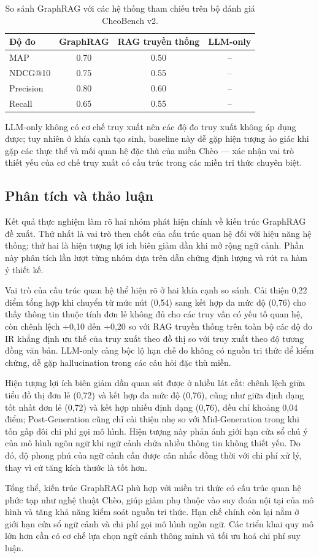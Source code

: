 \begin{table}[h]
\centering
\caption{So sánh GraphRAG với các hệ thống tham chiếu trên bộ đánh giá CheoBench v2.}
\label{tab:baseline_results}
\begin{tabular}{lccc}
\hline
\textbf{Độ đo} & \textbf{GraphRAG} & \textbf{RAG truyền thống} & \textbf{LLM-only} \\
\hline
MAP            & 0.70 & 0.50 & -- \\
NDCG@10        & 0.75 & 0.55 & -- \\
Precision      & 0.80 & 0.60 & -- \\
Recall         & 0.65 & 0.55 & -- \\
\hline
\end{tabular}
\end{table}

LLM-only không có cơ chế truy xuất nên các độ đo truy xuất không áp dụng được; tuy nhiên ở khía cạnh tạo sinh, baseline này dễ gặp hiện tượng ảo giác khi gặp các thực thể và mối quan hệ đặc thù của miền Chèo --- xác nhận vai trò thiết yếu của cơ chế truy xuất có cấu trúc trong các miền tri thức chuyên biệt.

\subsection{Phân tích và thảo luận}

Kết quả thực nghiệm làm rõ hai nhóm phát hiện chính về kiến trúc GraphRAG đề xuất. Thứ nhất là vai trò then chốt của cấu trúc quan hệ đối với hiệu năng hệ thống; thứ hai là hiện tượng lợi ích biên giảm dần khi mở rộng ngữ cảnh. Phần này phân tích lần lượt từng nhóm dựa trên dẫn chứng định lượng và rút ra hàm ý thiết kế.

Vai trò của cấu trúc quan hệ thể hiện rõ ở hai khía cạnh so sánh. Cải thiện 0,22 điểm tổng hợp khi chuyển từ mức nút (0,54) sang kết hợp đa mức độ (0,76) cho thấy thông tin thuộc tính đơn lẻ không đủ cho các truy vấn có yếu tố quan hệ, còn chênh lệch +0,10 đến +0,20 so với RAG truyền thống trên toàn bộ các độ đo IR khẳng định ưu thế của truy xuất theo đồ thị so với truy xuất theo độ tương đồng văn bản. LLM-only càng bộc lộ hạn chế do không có nguồn tri thức để kiểm chứng, dễ gặp hallucination trong các câu hỏi đặc thù miền.

Hiện tượng lợi ích biên giảm dần quan sát được ở nhiều lát cắt: chênh lệch giữa tiểu đồ thị đơn lẻ (0,72) và kết hợp đa mức độ (0,76), cũng như giữa định dạng tốt nhất đơn lẻ (0,72) và kết hợp nhiều định dạng (0,76), đều chỉ khoảng 0,04 điểm; Post-Generation cũng chỉ cải thiện nhẹ so với Mid-Generation trong khi tốn gấp đôi chi phí gọi mô hình. Hiện tượng này phản ánh giới hạn cửa sổ chú ý của mô hình ngôn ngữ khi ngữ cảnh chứa nhiều thông tin không thiết yếu. Do đó, độ phong phú của ngữ cảnh cần được cân nhắc đồng thời với chi phí xử lý, thay vì cứ tăng kích thước là tốt hơn.

Tổng thể, kiến trúc GraphRAG phù hợp với miền tri thức có cấu trúc quan hệ phức tạp như nghệ thuật Chèo, giúp giảm phụ thuộc vào suy đoán nội tại của mô hình và tăng khả năng kiểm soát nguồn tri thức. Hạn chế chính còn lại nằm ở giới hạn cửa sổ ngữ cảnh và chi phí gọi mô hình ngôn ngữ. Các triển khai quy mô lớn hơn cần có cơ chế lựa chọn ngữ cảnh thông minh và tối ưu hoá chi phí suy luận.
